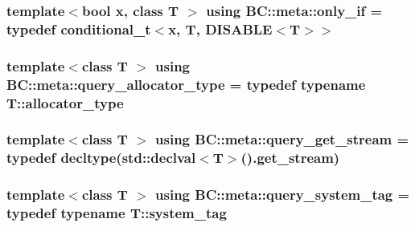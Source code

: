 \subsubsection[{\texorpdfstring{only\+\_\+if}{only_if}}]{\setlength{\rightskip}{0pt plus 5cm}template$<$bool x, class T $>$ using {\bf B\+C\+::meta\+::only\+\_\+if} = typedef conditional\+\_\+t$<$x, T, D\+I\+S\+A\+B\+LE$<$T$>$$>$}\hypertarget{namespaceBC_1_1meta_afed7f4daa1d160f98e989138722fd031}{}\label{namespaceBC_1_1meta_afed7f4daa1d160f98e989138722fd031}
\subsubsection[{\texorpdfstring{query\+\_\+allocator\+\_\+type}{query_allocator_type}}]{\setlength{\rightskip}{0pt plus 5cm}template$<$class T $>$ using {\bf B\+C\+::meta\+::query\+\_\+allocator\+\_\+type} = typedef typename T\+::allocator\+\_\+type}\hypertarget{namespaceBC_1_1meta_ab8436259bffb6e3c72b402744e6dc707}{}\label{namespaceBC_1_1meta_ab8436259bffb6e3c72b402744e6dc707}
\subsubsection[{\texorpdfstring{query\+\_\+get\+\_\+stream}{query_get_stream}}]{\setlength{\rightskip}{0pt plus 5cm}template$<$class T $>$ using {\bf B\+C\+::meta\+::query\+\_\+get\+\_\+stream} = typedef decltype(std\+::declval$<$T$>$().get\+\_\+stream)}\hypertarget{namespaceBC_1_1meta_a44d5ad654ba538cd0f7c697a1693fc7f}{}\label{namespaceBC_1_1meta_a44d5ad654ba538cd0f7c697a1693fc7f}
\subsubsection[{\texorpdfstring{query\+\_\+system\+\_\+tag}{query_system_tag}}]{\setlength{\rightskip}{0pt plus 5cm}template$<$class T $>$ using {\bf B\+C\+::meta\+::query\+\_\+system\+\_\+tag} = typedef typename T\+::system\+\_\+tag}\hypertarget{namespaceBC_1_1meta_a4c0dfe841ff90bea709f1289cb3718ea}{}\label{namespaceBC_1_1meta_a4c0dfe841ff90bea709f1289cb3718ea}
